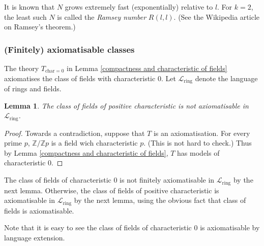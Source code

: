 \documentclass[a4paper, 11pt]{amsart}
\newtheorem{lemma}[lemma]{Lemma}
\theoremstyle{remark}
\newcommand{\ZZ}{\mathbb{Z}}
\newcommand{\cL}{\mathcal L}
\begin{document}
It is known that $N$ grows extremely fast (exponentially) relative to $l$. 
For $k=2$, the least such $N$ is called the \emph{Ramsey number} $R(l,l)$. (See the Wikipedia article on Ramsey's theorem.) 




\subsubsection{(Finitely) axiomatisable classes} 


The theory $T_{\text{char}=0}$ in  Lemma \ref{compactness and characteristic of fields} axiomatises the class of fields with characteristic $0$. 
Let $\cL_{\mathrm{ring}}$ denote the language of rings and fields. 


\begin{lemma} 
The class of fields of positive characteristic is not axiomatisable in $\cL_{\mathrm{ring}}$. 
\end{lemma} 
\begin{proof} 
Towards a contradiction, suppose that $T$ is an axiomatisation. 
For every prime $p$, $\ZZ/\ZZ p$ is a field wich characteristic $p$. (This is not hard to check.) 
Thus by Lemma \ref{compactness and characteristic of fields}, $T$ has models of characteristic $0$. 
\end{proof} 

The class of fields of characteristic $0$ is not finitely axiomatisable in $\cL_{\mathrm{ring}}$ by the next lemma. 
Otherwise, the class of fields of positive characteristic is axiomatisable in $\cL_{\mathrm{ring}}$ by the next lemma, using the obvious fact that class of fields is axiomatisable. 

Note that it is easy to see the class of fields of characteristic $0$ is axiomatisable by language extension. 
\end{document}
